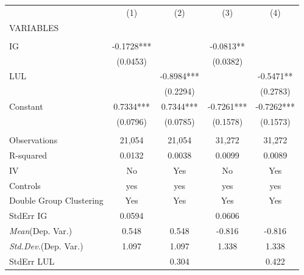 \documentclass[]{article}
\begin{document}
\begin{tabular}{lcccc} \hline
 & (1) & (2) & (3) & (4) \\
VARIABLES &  &  &  &  \\ \hline
 &  &  &  &  \\
IG & -0.1728*** &  & -0.0813** &  \\
 & (0.0453) &  & (0.0382) &  \\
LUL &  & -0.8984*** &  & -0.5471** \\
 &  & (0.2294) &  & (0.2783) \\
Constant & 0.7334*** & 0.7344*** & -0.7261*** & -0.7262*** \\
 & (0.0796) & (0.0785) & (0.1578) & (0.1573) \\
 &  &  &  &  \\
Observations & 21,054 & 21,054 & 31,272 & 31,272 \\
R-squared & 0.0132 & 0.0038 & 0.0099 & 0.0089 \\
IV & No & Yes & No & Yes \\
Controls & yes & yes & yes & yes \\
Double Group Clustering & Yes & Yes & Yes & Yes \\
StdErr IG & 0.0594 &  & 0.0606 &  \\
\textit{Mean}(Dep. Var.) & 0.548 & 0.548 & -0.816 & -0.816 \\
\textit{Std.Dev.}(Dep. Var.) & 1.097 & 1.097 & 1.338 & 1.338 \\
 StdErr LUL &  & 0.304 &  & 0.422 \\ \hline
\end{tabular}
\end{document}
